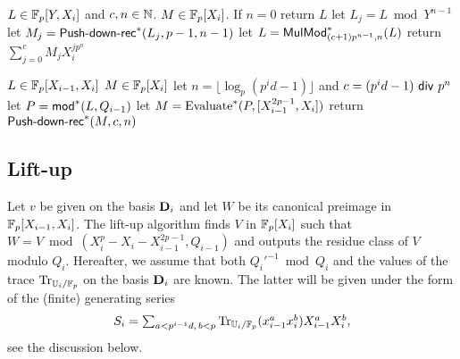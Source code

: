 \begin{algorithm}
  \caption{$\dual{\alg{\text{Push-down-rec}}}$}
  \begin{algorithmic}[1]
    \REQUIRE $L\in\mathbb{F}_p[Y,X_i]$ and $c,n\in\mathbb{N}$.
    \ENSURE $M\in \mathbb{F}_p[X_i]$.
    \STATE If $n=0$ return $L$
    \STATE let $L_j = L \bmod Y^{n-1}$
    \STATE let $M_j=\text{\sf Push-down-rec}^\ast(L_j,p-1,n-1)$
    \STATE let $L = {\sf MulMod}_{(c+1)p^{n-1},n}^\ast(L)$
    \ENDFOR
    \STATE return $\sum_{j=0}^{c} M_j X_i^{jp^n}$
  \end{algorithmic}
\end{algorithm}
\begin{algorithm}
  \caption{$\dual{\alg{\text{Push-down}}}$}
  \begin{algorithmic}[1]
    \REQUIRE $L\in \mathbb{F}_p[X_{i-1},X_i]$
    \ENSURE $M \in \mathbb{F}_p[X_i]$
    \STATE let $n=\lfloor \log_p(p^id-1) \rfloor$ and $c=(p^id-1) {\sf~div~} p^n$
    \STATE let $P={\sf mod}^\ast(L,Q_{i-1})$
    \STATE let $M = \text{Evaluate}^\ast(P,[X_{i-1}^{2p-1},X_i])$
    \STATE return $\text{{\sf Push-down-rec}}^\ast(M,c,n)$
  \end{algorithmic}
\end{algorithm}


\subsection{Lift-up}
\label{sec:level-embedding:lift-up}

Let $v$ be given on the basis $\mathbf{D}_i$ and let $W$ be its canonical
preimage in $\mathbb{F}_p[X_{i-1},X_i]$.  The lift-up algorithm finds $V$ in
$\mathbb{F}_p[X_i]$ such that $W=V \bmod (X_i^p-X_i-X_{i-1}^{2p-1},Q_{i-1})$
and outputs the residue class of $V$ modulo $Q_i$. Hereafter, we
assume that both $Q_i'^{-1} \bmod Q_i$ and the values of the trace
$\operatorname{Tr}_{\mathbb{U}_i/\mathbb{F}_p}$ on the basis $\mathbf{D}_i$ are known.  The latter will be
given under the form of the (finite) generating series
$$\begin{array}{c}
  S_i=\sum_{a < p^{i-1}d,\, b < p} \operatorname{Tr}_{\mathbb{U}_i/\mathbb{F}_p}(x_{i-1}^ax_i^b)X_{i-1}^a X_i^b,
\end{array}
$$ 
see the discussion below.

